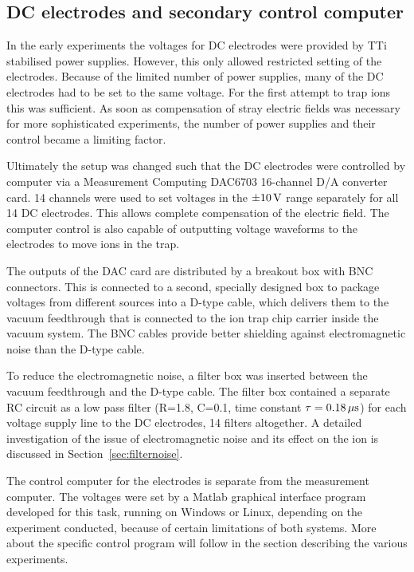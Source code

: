 \subsection{DC electrodes and secondary control computer}
\label{sec:dcelectrodecontrol}

In the early experiments the voltages for DC electrodes were provided by TTi stabilised power supplies. However, this only allowed restricted setting of the electrodes. Because of the limited number of power supplies, many of the DC electrodes had to be set to the same voltage. For the first attempt to trap ions this was sufficient. As soon as compensation of stray electric fields was necessary for more sophisticated experiments, the number of power supplies and their control became a limiting factor.

Ultimately the setup was changed such that the DC electrodes were controlled by computer via a Measurement Computing DAC6703 16-channel D/A converter card. 14 channels were used to set voltages in the $\pm 10\,\mbox{V}$ range separately for all 14 DC electrodes. This allows complete compensation of the electric field. The computer control is also capable of outputting voltage waveforms to the electrodes to move ions in the trap.

The outputs of the DAC card are distributed by a breakout box with BNC connectors. This is connected to a second, specially designed box to package voltages from different sources into a D-type cable, which delivers them to the vacuum feedthrough that is connected to the ion trap chip carrier inside the vacuum system. The BNC cables provide better shielding against electromagnetic noise than the D-type cable.

To reduce the electromagnetic noise, a filter box was inserted between the vacuum feedthrough and the D-type cable. The filter box contained a separate RC circuit as a low pass filter (R=1.8\kOhm, C=0.1\uF, time constant $\tau = 0.18\,\mbox{$\mu$s}$) for each voltage supply line to the DC electrodes, 14 filters altogether.  A detailed investigation of the issue of electromagnetic noise and its effect on the ion is discussed in Section~\ref{sec:filternoise}.

The control computer for the electrodes is separate from the measurement computer. The voltages were set by a Matlab graphical interface program developed for this task, running on Windows or Linux, depending on the experiment conducted, because of certain limitations of both systems. More about the specific control program will follow in the section describing the various experiments.


